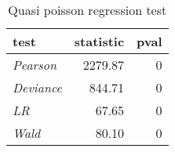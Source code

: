 \begin{wraptable}{r}{2.5in}

\caption{\label{tab:quasipoisson_reg_tests}Quasi poisson regression test}
\centering
\fontsize{9}{11}\selectfont
\begin{tabular}[t]{>{}lrr}
\toprule
test & statistic & pval\\
\midrule
\em{Pearson} & 2279.87 & 0\\
\em{Deviance} & 844.71 & 0\\
\em{LR} & 67.65 & 0\\
\em{Wald} & 80.10 & 0\\
\bottomrule
\end{tabular}
\end{wraptable}
